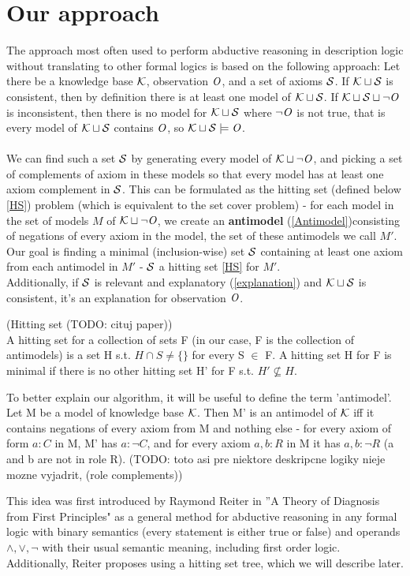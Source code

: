 \chapter{Our approach}\label{chap:proposal}
The approach most often used to perform abductive reasoning in description logic without translating to other formal logics is based on the following approach:
Let there be a knowledge base $\K$, observation $\Obs$, and a set of axioms $\S$. If $\K \sqcup \S$ is consistent, then by definition there is at least one model of $\K \sqcup \S$.  If $\K \sqcup \S \sqcup \neg \Obs$ is inconsistent, then there is no model for $\K \sqcup \S$ where $\neg \Obs$ is not true, that is every model of $\K \sqcup \S$ contains $\Obs$, so $\K \sqcup \S \models \Obs$. \\ \\
We can find such a set $\S$ by generating every model of $\K \sqcup \neg \Obs$, and picking a set of complements of axiom in these models so that every model has at least one axiom complement in $\S$. This can be formulated as the hitting set (defined below \ref{HS}) problem (which is equivalent to the set cover problem) - for each model in the set of models $M$ of  $\K \sqcup \neg \Obs$, we create an \textbf{antimodel} (\ref{Antimodel})consisting of negations of every axiom in the model, the set of these antimodels we call $M'$. Our goal is finding a minimal (inclusion-wise) set $\S$ containing at least one axiom from each antimodel in $M'$ - $\S$ a hitting set \ref{HS} for $M'$.
\\

Additionally, if $\S$ is relevant and explanatory (\ref{explanation}) and $\K \sqcup \S$ is consistent, it's an explanation for observation $\Obs$.
\\ 

\begin{mydef} \label{HS} (Hitting set  (TODO: cituj paper)) \\
A hitting set for a collection of
sets F (in our case, F is the collection of antimodels) is a set H s.t. $H \cap S \neq  \{\}$ for every S $\in$ F. A hitting set H for F is
minimal if there is no other hitting set H' for F s.t. $H' \not \subseteq H$.
\end{mydef}
\begin{mydef} \label{Antimodel} 
To better explain our algorithm, it will be useful to define the term 'antimodel'. Let M be a model of knowledge base $\K$. Then M' is an antimodel of $\K$ iff it contains negations of every axiom from M and nothing else - for every axiom of form $a:C$ in M, M' has $a:\neg C$, and for every axiom $a,b:R$ in M it has $a,b:\neg R$ (a and b are not in role R). (TODO: toto asi pre niektore deskripcne logiky nieje mozne vyjadrit, (role complements))
\end{mydef}
This idea was first introduced by Raymond Reiter in ''A Theory of Diagnosis from First Principles" \cite{Reiter1987} as a general method for abductive reasoning in any formal logic with binary semantics (every statement is either true or false) and operands $\land , \lor, \neg$  with their usual semantic meaning, including first order logic. Additionally, Reiter proposes using a hitting set tree, which we will describe later.


